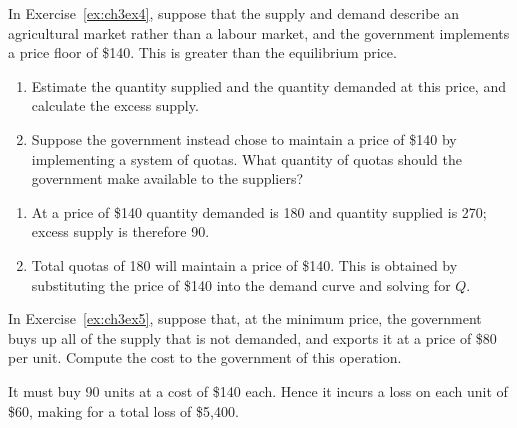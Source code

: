 \begin{enumialphparenastyle}
\begin{econex}
\begin{econsolution}
\begin{center*}
	\end{center*}
\end{econsolution}
\end{econex}

\begin{econex}\label{ex:ch3ex5}
In Exercise~\ref{ex:ch3ex4}, suppose that the supply and demand describe an agricultural market rather than a labour market, and the government implements a price floor of \$140. This is greater than the equilibrium price.
\begin{enumerate}
	\item	Estimate the quantity supplied and the quantity demanded at this price, and calculate the excess supply.
	\item	Suppose the government instead chose to maintain a price of \$140 by implementing a system of quotas. What quantity of quotas should the government make available to the suppliers?
\end{enumerate}
\begin{econsolution}
\begin{enumerate}
	\item	At a price of \$140 quantity demanded is 180 and quantity supplied is 270; excess supply is therefore 90.
	\item	Total quotas of 180 will maintain a price of \$140. This is obtained by substituting the price of \$140 into the demand curve and solving for $Q$.
\end{enumerate}
\end{econsolution}
\end{econex}

\begin{econex}\label{ex:ch3ex6}
In Exercise~\ref{ex:ch3ex5}, suppose that, at the minimum price, the government buys up all of the supply that is not demanded, and exports it at a price of \$80 per unit. Compute the cost to the government of this operation.
\begin{econsolution}
	It must buy 90 units at a cost of \$140 each. Hence it incurs a loss on each unit of \$60, making for a total loss of \$5,400.
	

\end{econsolution}
\end{econex}
\end{enumialphparenastyle}

